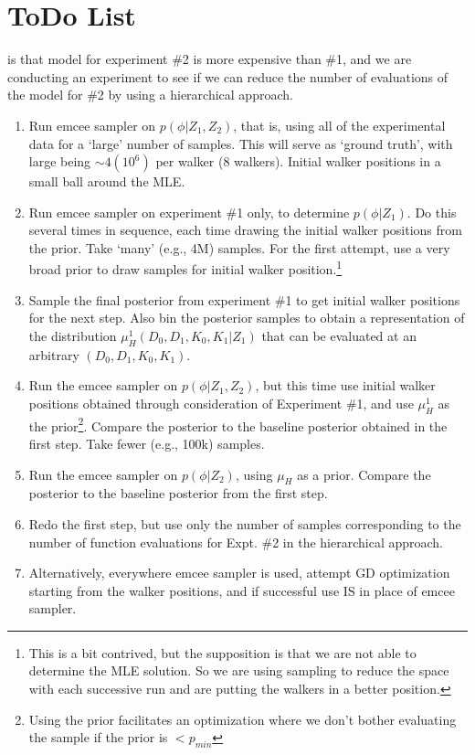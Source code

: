 \documentclass{tufte-handout}
\begin{document}
\section{ToDo List}
 is that model for experiment \#2 is more expensive
than \#1, and we are conducting an experiment to see if we can reduce the
number of evaluations of the model for \#2 by using a hierarchical approach.
\begin{enumerate}
    \item Run emcee sampler on $p(\phi|Z_1,Z_2)$, that is, using all of the
        experimental data for a `large' number of samples. This will serve as
        `ground truth', with large being $\sim 4(10^6)$ per walker (8 walkers).
        Initial walker positions in a small ball around the MLE.
    \item Run emcee sampler on experiment \#1 only, to determine $p(\phi|Z_1)$.
        Do this several times in sequence, each time drawing the initial walker
        positions from the prior. Take `many' (e.g., 4M) samples. For the first
        attempt, use a very broad prior to draw samples for initial walker
        position.\footnote{This is a bit contrived, but the supposition is that
        we are not able to determine the MLE solution. So we are using sampling
    to reduce the space with each successive run and are putting the walkers in
a better position.}
    \item Sample the final posterior from experiment \#1 to get initial walker
        positions for the next step. Also bin the posterior samples to obtain a
        representation of the distribution $\mu_{H}^1(D_0,D_1,K_0,K_1|Z_1)$
        that can be evaluated at an arbitrary $(D_0,D_1,K_0,K_1)$.
    \item Run the emcee sampler on $p(\phi|Z_1,Z_2)$, but this time use initial
        walker positions obtained through consideration of Experiment \#1, and
        use $\mu_H^1$ as the prior\footnote{Using the prior facilitates an optimization where we don't bother evaluating the sample if the prior is $< p_{min}$}. Compare the posterior to the baseline
        posterior obtained in the first step.  Take fewer (e.g., 100k) samples. 
    \item Run the emcee sampler on $p(\phi|Z_2)$, using $\mu_H$ as a prior.
        Compare the posterior to the baseline posterior from the first step.
    \item Redo the first step, but use only the number of samples corresponding
        to the number of function evaluations for Expt. \#2 in the hierarchical
        approach.
    \item Alternatively, everywhere emcee sampler is used, attempt GD
        optimization starting from the walker positions, and if successful use
        IS in place of emcee sampler. 
\end{enumerate}




\end{document}

